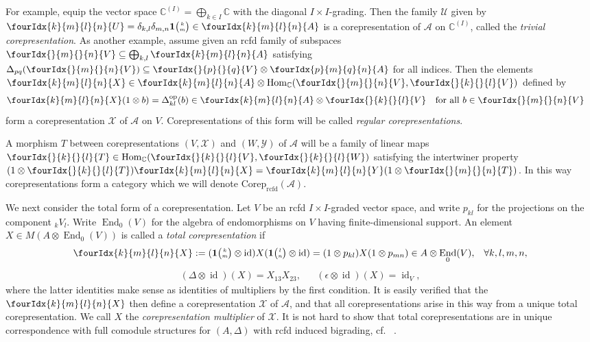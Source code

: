 \documentclass[10pt]{article}
\DeclareMathOperator{\End}{\mathrm{End}}
\DeclareMathOperator{\id}{id}
\DeclareMathOperator{\Hom}{Hom}
\DeclareMathOperator{\op}{\mathrm{op}}
\DeclareMathOperator{\rcf}{\mathrm{rcfd}}
\newcommand{\Corep}{\mathrm{Corep}}
\newcommand{\C}{\mathbb{C}}
\newcommand{\GrDA}[3]{{}_{#2}#1_{#3}} %
\newcommand{\Grt}[3]{#1{\tiny {\begin{pmatrix} #2\\#3\end{pmatrix}}}}
\newcommand{\UnitC}[2]{\Grt{\mathbf{1}}{#1}{#2}}
\newcommand{\IdCV}[2]{p_{#1#2}}
\newcommand{\Gr}[5]{\fourIdx{#2}{#4}{#3}{#5}{#1}}%
\newcommand{\Gru}[3]{\Gr{#1}{}{}{#2}{#3}}
\theoremstyle{definition}
\numberwithin{equation}{section}
\begin{document}
 For example, equip the vector space
  $\C^{(I)}=\bigoplus_{k\in I} \C$ with the diagonal
  $I\times I$-grading. Then the family $\mathscr{U}$ given by $\Gr{U}{k}{l}{m}{n} = \delta_{k,l}\delta_{m,n} \UnitC{k}{m} \in
    \Gr{A}{k}{l}{m}{n}$
is a corepresentation of $\mathscr{A}$ on $\C^{(I)}$, called the
\emph{trivial corepresentation}. As another example,  assume  given an rcfd family of subspaces
  $\Gru{V}{m}{n} \subseteq \bigoplus_{k,l} \Gr{A}{k}{l}{m}{n}$ satisfying
  $\Delta_{pq}(\Gru{V}{m}{n}) \subseteq \Gru{V}{p}{q} \otimes
    \Gr{A}{p}{q}{m}{n}$ for all indices.
Then the  elements $\Gr{X}{k}{l}{m}{n} \in \Gr{A}{k}{l}{m}{n} \otimes
  \Hom_{\C}(\Gru{V}{m}{n},\Gru{V}{k}{l})$ defined by 
  \begin{align*}
    \Gr{X}{k}{l}{m}{n}(1 \otimes b) &= \Delta^{\op}_{kl}(b) \in
    \Gr{A}{k}{l}{m}{n} \otimes \Gru{V}{k}{l} \quad
    \text{for all } b\in \Gru{V}{m}{n}
  \end{align*}
  form a corepresentation $\mathscr{X}$ of $\mathscr{A}$ on
  $V$. Corepresentations of this form will be called
  \emph{regular corepresentations}. 

 A morphism  $T$ between corepresentations
  $(V,\mathscr{X})$ and $(W,\mathscr{Y})$ of $\mathscr{A}$ will be a family
  of linear maps $\Gru{T}{k}{l} \in
  \Hom_\C(\Gru{V}{k}{l},\Gru{W}{k}{l})$ satisfying the intertwiner property $(1 \otimes
  \Gru{T}{k}{l})\Gr{X}{k}{l}{m}{n} = \Gr{Y}{k}{l}{m}{n}(1 \otimes
  \Gru{T}{m}{n})$.  In this way corepresentations form a category which we will denote
$\Corep_{\rcf}(\mathscr{A})$.

We next consider the total form of a corepresentation. Let $V$ be an rcfd $I\times I$-graded vector space, and write $\IdCV{k}{l}$ for the projections on the component $\GrDA{V}{k}{l}$. Write $\End_0(V)$ for the algebra of endomorphisms on $V$ having finite-dimensional support. An element $X \in  M(A
  \otimes \End_{0}(V))$ is called a \emph{total corepresentation} if \begin{align*} \Gr{X}{k}{l}{m}{n} := (\UnitC{k}{m} \otimes \id){X}(\UnitC{l}{n}
    \otimes \id) = (1 \otimes \IdCV{k}{l}){X}(1 \otimes
    \IdCV{m}{n}) \in A \otimes \End_0(V),&& \forall k,l,m,n,\end{align*} \begin{align*} (\Delta\otimes \id)(X)=X_{13}X_{23}, && (\epsilon \otimes \id)({X}) = \id_{V},\end{align*} where the latter identities make sense as identities of multipliers by the first condition. It is easily verified that the $\Gr{X}{k}{l}{m}{n}$ then define a corepresentation $\mathscr{X}$ of $\mathscr{A}$, and that all corepresentations arise in this way from a unique total corepresentation. We call $X$ the \emph{corepresentation multiplier} of $\mathscr{X}$. It is not hard to show that total corepresentations are in unique correspondence with full comodule structures for $(A,\Delta)$ with rcfd induced bigrading, cf.~ \cite[Definition 2.2, Definition 4.2 and Theorem 4.5]{Boh2}.
\end{document}
